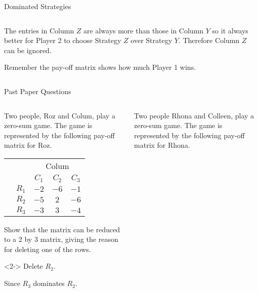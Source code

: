 \documentclass[8pt]{beamer}
\begin{document}
\begin{frame}[shrink=5]{Dominated Strategies}
\begin{columns}[T]
\begin{column}{.5\linewidth}
The entries in Column $Z$ are always more than those in Column  $Y$ so it always better for Player 2 to choose Strategy  $Z$ over Strategy  $Y$. Therefore Column  $Z$ can be ignored.

\alert<1>{Remember the pay-off matrix shows how much Player 1 wins.}
\end{column}
\end{columns}
\end{frame}

\begin{frame}{Past Paper Questions}
	\begin{columns}[T]
	\begin{column}{.5\linewidth}
	\begin{problem}
		Two people, Roz and Colum, play a zero-sum game. The game is represented by the following pay-off matrix for Roz.


		\begin{center}
\colorbox{cc}{
	\setlength\arrayrulewidth{0.5mm}
\begin{tabular}{cc|ccc}
	\multicolumn{2}{c}{} & \multicolumn{3}{c}{Colum}\\
\multicolumn{1}{c}{} &  & $C_1$  & $C_2$ & $C_3$ \\ \hline
\raisebox{0.0cm}{\multirow{3}*{\rotatebox{90}{Roz}}}  & $R_1$ & $-2$ & $-6$ & $-1$ \\
& $R_2$ & $-5$ & $2$ & $-6$ \\
& $R_3$ & $-3$ & $3$ & $-4$ \\
\end{tabular}}
\end{center}

Show that the matrix can be reduced to a 2 by 3 matrix, giving the reason for deleting one of the rows.
\end{problem}
	\begin{solution}<2->
		Delete $ R_2$.

		Since $ R_3$ dominates $ R_2$.
	\end{solution}

	\end{column}
	\begin{column}{.5\linewidth}
\begin{problem}
Two people Rhona and Colleen, play a zero-sum game. The game is represented by the following pay-off matrix for Rhona.



\end{problem}
\end{column}
\end{columns}
\end{frame}
\end{document}
